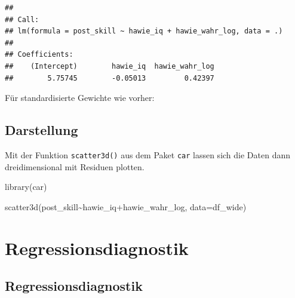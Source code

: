 \documentclass[
]{book}
\newenvironment{Shaded}{\begin{snugshade}}{\end{snugshade}}
\newcommand{\AttributeTok}[1]{\textcolor[rgb]{0.77,0.63,0.00}{#1}}
\newcommand{\FunctionTok}[1]{\textcolor[rgb]{0.00,0.00,0.00}{#1}}
\newcommand{\NormalTok}[1]{#1}
\newcommand{\OtherTok}[1]{\textcolor[rgb]{0.56,0.35,0.01}{#1}}
\newcommand{\SpecialCharTok}[1]{\textcolor[rgb]{0.00,0.00,0.00}{#1}}
\begin{document}
\begin{verbatim}
## 
## Call:
## lm(formula = post_skill ~ hawie_iq + hawie_wahr_log, data = .)
## 
## Coefficients:
##    (Intercept)        hawie_iq  hawie_wahr_log  
##        5.75745        -0.05013         0.42397
\end{verbatim}

Für standardisierte Gewichte wie vorher:

\begin{Shaded}
\end{Shaded}

\hypertarget{darstellung}{%
\subsection{Darstellung}\label{darstellung}}

Mit der Funktion \texttt{scatter3d()} aus dem Paket \texttt{car} lassen sich die Daten dann dreidimensional mit Residuen plotten.

\begin{Shaded}
\begin{Highlighting}[]
\FunctionTok{library}\NormalTok{(car)}

\FunctionTok{scatter3d}\NormalTok{(post\_skill}\SpecialCharTok{\textasciitilde{}}\NormalTok{hawie\_iq}\SpecialCharTok{+}\NormalTok{hawie\_wahr\_log, }
          \AttributeTok{data=}\NormalTok{df\_wide)}
\end{Highlighting}
\end{Shaded}

\hypertarget{regressionsdiagnostik}{%
\section{Regressionsdiagnostik}\label{regressionsdiagnostik}}

\hypertarget{regressionsdiagnostik-1}{%
\subsection{Regressionsdiagnostik}\label{regressionsdiagnostik-1}}
\end{document}

